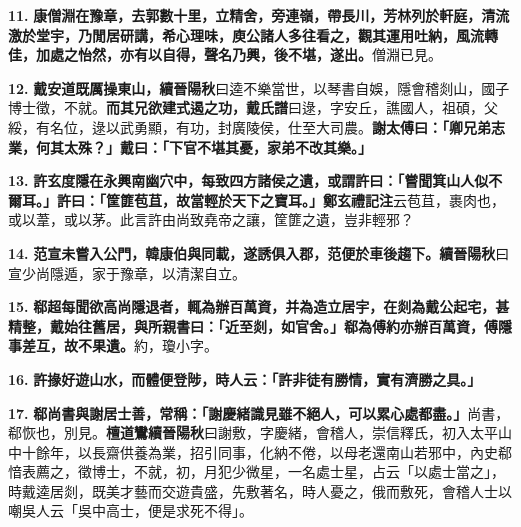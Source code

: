 \textbf{11.} \textbf{康僧淵在豫章，去郭數十里，立精舍，旁連嶺，帶長川，芳林列於軒庭，清流激於堂宇，乃閒居研講，希心理味，庾公諸人多往看之，觀其運用吐納，風流轉佳，加處之怡然，亦有以自得，聲名乃興，後不堪，遂出。}{\footnotesize 僧淵已見。}

\textbf{12.} \textbf{戴安道既厲操東山，}{\footnotesize \textbf{續晉陽秋}曰逵不樂當世，以琴書自娛，隱會稽剡山，國子博士徵，不就。}\textbf{而其兄欲建式遏之功，}{\footnotesize \textbf{戴氏譜}曰逯，字安丘，譙國人，祖碩，父綏，有名位，逯以武勇顯，有功，封廣陵侯，仕至大司農。}\textbf{謝太傅曰：「卿兄弟志業，何其太殊？」戴曰：「下官不堪其憂，家弟不改其樂。」}

\textbf{13.} \textbf{許玄度隱在永興南幽穴中，每致四方諸侯之遺，或謂許曰：「嘗聞箕山人似不爾耳。」許曰：「筐篚苞苴，故當輕於天下之寶耳。」}{\footnotesize \textbf{鄭玄禮記注}云苞苴，裹肉也，或以葦，或以茅。此言許由尚致堯帝之讓，筐篚之遺，豈非輕邪？}

\textbf{14.} \textbf{范宣未嘗入公門，韓康伯與同載，遂誘俱入郡，范便於車後趨下。}{\footnotesize \textbf{續晉陽秋}曰宣少尚隱遁，家于豫章，以清潔自立。}

\textbf{15.} \textbf{郗超每聞欲高尚隱退者，輒為辦百萬資，并為造立居宇，在剡為戴公起宅，甚精整，戴始往舊居，與所親書曰：「近至剡，如官舍。」郗為傅約亦辦百萬資，傅隱事差互，故不果遺。}{\footnotesize 約，瓊小字。}

\textbf{16.} \textbf{許掾好遊山水，而體便登陟，時人云：「許非徒有勝情，實有濟勝之具。」}

\textbf{17.} \textbf{郗尚書與謝居士善，常稱：「謝慶緒識見雖不絕人，可以累心處都盡。」}{\footnotesize 尚書，郗恢也，別見。\textbf{檀道鸞續晉陽秋}曰謝敷，字慶緒，會稽人，崇信釋氏，初入太平山中十餘年，以長齋供養為業，招引同事，化納不倦，以母老還南山若邪中，內史郗愔表薦之，徵博士，不就，初，月犯少微星，一名處士星，占云「以處士當之」，時戴逵居剡，既美才藝而交遊貴盛，先敷著名，時人憂之，俄而敷死，會稽人士以嘲吳人云「吳中高士，便是求死不得」。}
